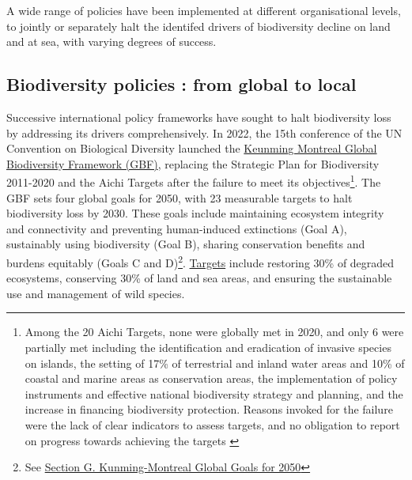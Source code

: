 	A wide range of policies have been implemented at different organisational levels, to jointly or separately halt the identifed drivers of biodiversity decline on land and at sea, with varying degrees of success. 

{}
\subsection*{Biodiversity policies : from global to local}
\par
Successive international policy frameworks have sought to halt biodiversity loss by addressing its drivers comprehensively. In 2022, the 15th conference of the UN Convention on Biological Diversity launched the \href{https://www.cbd.int/doc/c/e6d3/cd1d/daf663719a03902a9b116c34/cop-15-l-25-en.pdf}{Keunming Montreal Global Biodiversity Framework (GBF)}, replacing the Strategic Plan for Biodiversity 2011-2020 and the Aichi Targets after the failure to meet its objectives\footnote{Among the 20 Aichi Targets, none were globally met in 2020, and only 6 were partially met including the identification and eradication of invasive species on islands, the setting of 17\% of terrestrial and inland water areas and 10\% of coastal and marine areas as conservation areas, the implementation of policy instruments and effective national biodiversity strategy and planning, and the increase in financing biodiversity protection. Reasons invoked for the failure were the lack of clear indicators to assess targets, and no obligation to report on progress towards achieving the targets  \citep{maron_setting_2021}}. The GBF sets four global goals for 2050, with 23 measurable targets to halt biodiversity loss by 2030. These goals include maintaining ecosystem integrity and connectivity and preventing human-induced extinctions (Goal A), sustainably using biodiversity (Goal B), sharing conservation benefits and burdens equitably (Goals C and D)\footnote{See \href{https://www.cbd.int/doc/c/e6d3/cd1d/daf663719a03902a9b116c34/cop-15-l-25-en.pdf}{Section G. Kunming-Montreal Global Goals for 2050}}. \href{https://www.cbd.int/gbf/targets/5}{Targets} include restoring 30\% of degraded ecosystems, conserving 30\% of land and sea areas, and ensuring the sustainable use and management of wild species.





